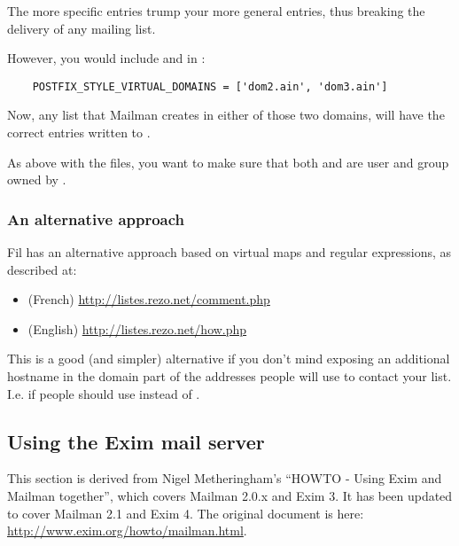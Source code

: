 \documentclass{howto}
\begin{document}
The more specific entries trump your more general entries, thus breaking the
delivery of any  mailing list.

However, you would include  and  in
:

\begin{verbatim}
    POSTFIX_STYLE_VIRTUAL_DOMAINS = ['dom2.ain', 'dom3.ain']
\end{verbatim}

Now, any list that Mailman creates in either of those two domains, will have
the correct entries written to .

As above with the  files, you want to make sure that both
 and  are user and
group owned by .

\subsubsection{An alternative approach}

Fil  has an alternative approach based on virtual maps and
regular expressions, as described at:

\begin{itemize}
\item (French)  \url{http://listes.rezo.net/comment.php}
\item (English) \url{http://listes.rezo.net/how.php}
\end{itemize}

This is a good (and simpler) alternative if you don't mind exposing an
additional hostname in the domain part of the addresses people will use to
contact your list.  I.e. if people should use 
instead of .

\subsection{Using the Exim mail server}

\begin{notice}[note]
This section is derived from Nigel Metheringham's ``HOWTO - Using Exim and
Mailman together'', which covers Mailman 2.0.x and Exim 3.  It has been
updated to cover Mailman 2.1 and Exim 4.  The original document is here:
\url{http://www.exim.org/howto/mailman.html}.
\end{notice}
\end{document}
